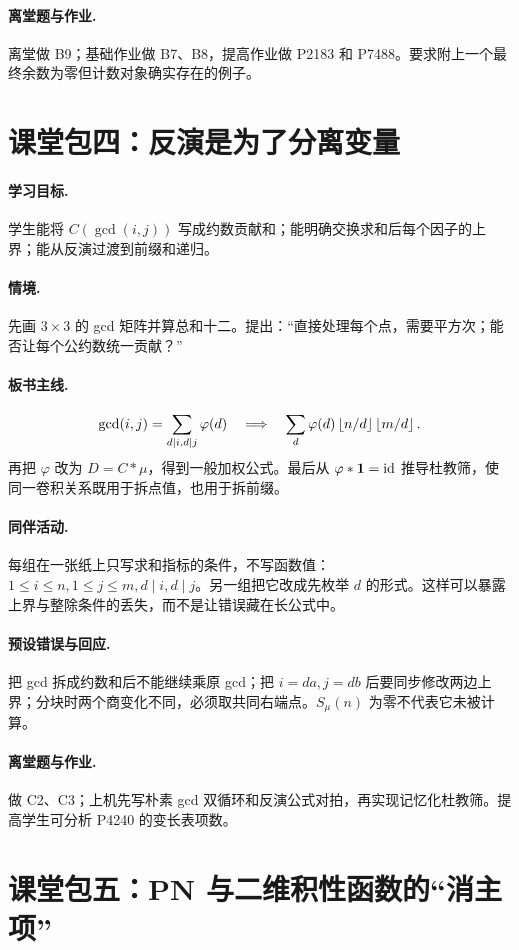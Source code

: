 \paragraph{离堂题与作业.} 离堂做 B9；基础作业做 B7、B8，提高作业做 P2183 和 P7488。要求附上一个最终余数为零但计数对象确实存在的例子。

\section{课堂包四：反演是为了分离变量}
\paragraph{学习目标.} 学生能将 $C(\gcd(i,j))$ 写成约数贡献和；能明确交换求和后每个因子的上界；能从反演过渡到前缀和递归。
\paragraph{情境.} 先画 $3\times3$ 的 gcd 矩阵并算总和十二。提出：“直接处理每个点，需要平方次；能否让每个公约数统一贡献？”
\paragraph{板书主线.}
\[
\gcd(i,j)=\sum_{d\mid i,d\mid j}\varphi(d)
\quad\Longrightarrow\quad
\sum_d\varphi(d)\left\lfloor n/d\right\rfloor\left\lfloor m/d\right\rfloor.
\]
再把 $\varphi$ 改为 $D=C*\mu$，得到一般加权公式。最后从 $\varphi*\mathbf 1=\operatorname{id}$ 推导杜教筛，使同一卷积关系既用于拆点值，也用于拆前缀。
\paragraph{同伴活动.} 每组在一张纸上只写求和指标的条件，不写函数值：$1\le i\le n,1\le j\le m,d\mid i,d\mid j$。另一组把它改成先枚举 $d$ 的形式。这样可以暴露上界与整除条件的丢失，而不是让错误藏在长公式中。
\paragraph{预设错误与回应.} 把 gcd 拆成约数和后不能继续乘原 gcd；把 $i=da,j=db$ 后要同步修改两边上界；分块时两个商变化不同，必须取共同右端点。$S_\mu(n)$ 为零不代表它未被计算。
\paragraph{离堂题与作业.} 做 C2、C3；上机先写朴素 gcd 双循环和反演公式对拍，再实现记忆化杜教筛。提高学生可分析 P4240 的变长表项数。

\section{课堂包五：PN 与二维积性函数的“消主项”}
